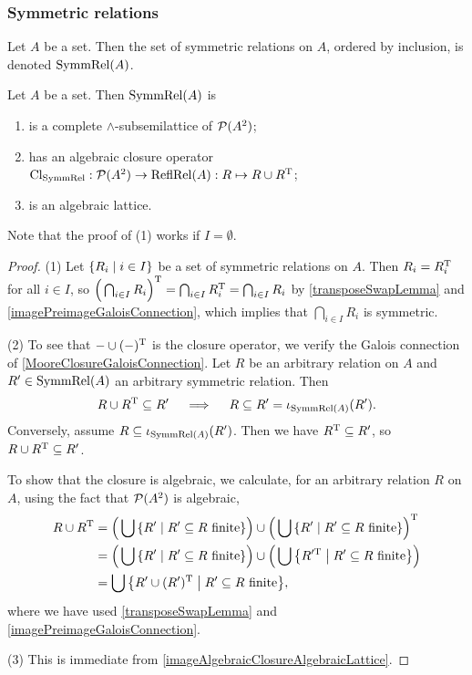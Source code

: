 \subsubsection{Symmetric relations}
\begin{definition}
Let $A$ be a set. Then the set of symmetric relations on $A$, ordered by inclusion, is denoted $\operatorname{SymmRel}(A)$.
\end{definition}

\begin{proposition}
Let $A$ be a set. Then $\operatorname{SymmRel}(A)$ is
\begin{enumerate}
\item is a complete $\wedge$-subsemilattice of $\operatorname{\mathcal{P}}(A^2)$;
\item has an algebraic closure operator $\operatorname{Cl}_{\operatorname{SymmRel}}: \operatorname{\mathcal{P}}(A^2)\to \operatorname{ReflRel}(A): R\mapsto R\cup R^{\mathrm{T}}$;
\item is an algebraic lattice.
\end{enumerate}
\end{proposition}
Note that the proof of (1) works if $I=\emptyset$. 
\begin{proof}
(1) Let $\setbuilder{R_i}{i\in I}$ be a set of symmetric relations on $A$. Then $R_i = R_i^{\mathrm{T}}$ for all $i\in I$, so $\Big(\bigcap_{i\in I}R_i\Big)^{\mathrm{T}} = \bigcap_{i\in I}R_i^{\mathrm{T}} = \bigcap_{i\in I}R_i$ by \ref{transposeSwapLemma} and \ref{imagePreimageGaloisConnection}, which implies that $\bigcap_{i\in I}R_i$ is symmetric.

(2) To see that $- \cup (-)^{\mathrm{T}}$ is the closure operator, we verify the Galois connection of \ref{MooreClosureGaloisConnection}. Let $R$ be an arbitrary relation on $A$ and $R'\in \operatorname{SymmRel}(A)$ an arbitrary symmetric relation. Then
\[ R\cup R^{\mathrm{T}} \subseteq R' \quad\implies\quad R\subseteq R' = \operatorname{\iota}_{\operatorname{SymmRel}(A)}(R'). \]
Conversely, assume $R \subseteq \operatorname{\iota}_{\operatorname{SymmRel}(A)}(R')$. Then we have $R^{\mathrm{T}} \subseteq R'$, so $R\cup R^{\mathrm{T}} \subseteq R'$.

To show that the closure is algebraic, we calculate, for an arbitrary relation $R$ on $A$, using the fact that $\operatorname{\mathcal{P}}(A^2)$ is algebraic,
\begin{align*}
R\cup R^\transp &= \Big(\bigcup\setbuilder{R'}{\text{$R'\subseteq R$ finite}}\Big) \cup \Big(\bigcup\setbuilder{R'}{\text{$R'\subseteq R$ finite}}\Big)^\transp \\
&= \Big(\bigcup\setbuilder{R'}{\text{$R'\subseteq R$ finite}}\Big) \cup \Big(\bigcup\setbuilder{R'^\transp}{\text{$R'\subseteq R$ finite}}\Big) \\
&= \bigcup\setbuilder{R'\cup (R')^\transp}{\text{$R'\subseteq R$ finite}},
\end{align*}
where we have used \ref{transposeSwapLemma} and \ref{imagePreimageGaloisConnection}.

(3) This is immediate from \ref{imageAlgebraicClosureAlgebraicLattice}.
\end{proof}

